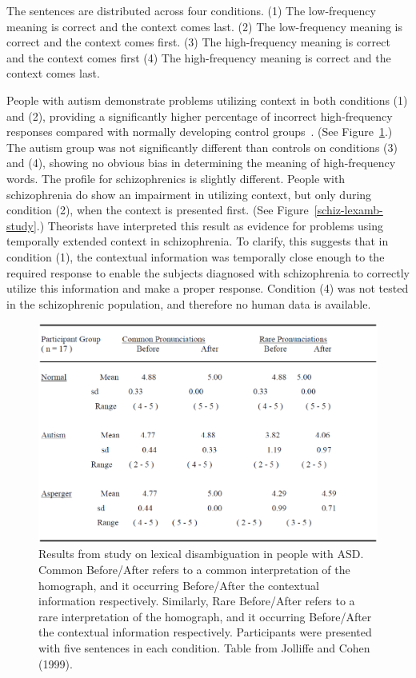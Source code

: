 \documentclass[man]{apa}
\begin{document}
The sentences are distributed across four conditions.  (1)  The low-frequency meaning is correct and the context comes last. (2)  The low-frequency meaning is correct and the context comes first.  (3)  The high-frequency meaning is correct and the context comes first (4) The high-frequency meaning is correct and the context comes last.

People with autism demonstrate problems utilizing context in both conditions (1) and (2), providing a significantly higher percentage of incorrect high-frequency responses compared with normally developing control groups~\cite{RefWorks:103,HappeF:1997:WCC_Homographs}.  (See Figure~\ref{asd-lexamb-study}.)  The autism group was not significantly different than controls on conditions (3) and (4), showing no obvious bias in determining the meaning of high-frequency words.  The profile for schizophrenics is slightly different.  People with schizophrenia do show an impairment in utilizing context, but only during condition (2), when the context is presented first. (See Figure~\ref{schiz-lexamb-study}.)  Theorists have interpreted this result as evidence for problems using temporally extended context in schizophrenia.  To clarify, this suggests that in condition (1), the contextual information was temporally close enough to the required response to enable the subjects diagnosed with schizophrenia to correctly utilize this information and make a proper response.  Condition (4) was not tested in the schizophrenic population, and therefore no human data is available.  

\begin{figure}[tp]
\begin{center}
	\includegraphics[width=115mm]{figures/asd_lexamb_study_results.eps}
\end{center}
\caption{Results from study on lexical disambiguation in people with ASD.  Common Before/After refers to a common interpretation of the homograph, and it occurring Before/After the contextual information respectively.  Similarly, Rare Before/After refers to a rare interpretation of the homograph, and it occurring Before/After the contextual information respectively. Participants were presented with five sentences in each condition.  Table from Jolliffe and Cohen (1999).}
\label{asd-lexamb-study}
\end{figure} 
\end{document}

